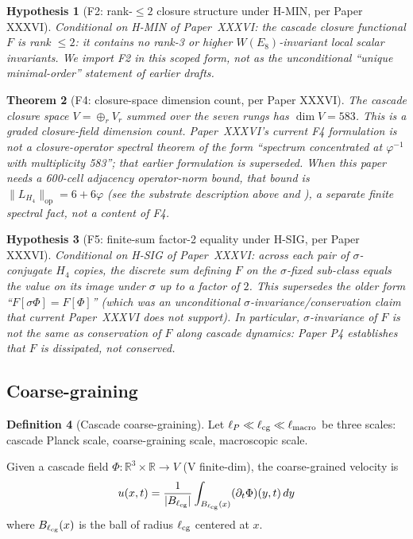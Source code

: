 \documentclass[11pt, a4paper]{amsart}
\newtheorem{theorem}{Theorem}[section]
\newtheorem{hypothesis}[theorem]{Hypothesis}
\theoremstyle{definition}
\newtheorem{definition}[theorem]{Definition}
\newcommand{\R}{\mathbb{R}}
\begin{document}
\begin{hypothesis}[F2: rank-$\le 2$ closure structure under H-MIN, per Paper XXXVI]\label{thm:F2}
\emph{Conditional on H-MIN of Paper~XXXVI}: the cascade closure
functional $F$ is rank $\leq 2$: it contains no rank-3 or higher
$W(E_8)$-invariant local scalar invariants. We import F2 in this
scoped form, not as the unconditional ``unique minimal-order''
statement of earlier drafts.
\end{hypothesis}

\begin{theorem}[F4: closure-space dimension count, per Paper XXXVI]\label{thm:F4}
The cascade closure space $V = \oplus_r V_r$ summed over the seven
rungs has $\dim V = 583$.  \emph{This is a graded
closure-field dimension count.}  Paper~XXXVI's current F4
formulation is \emph{not} a closure-operator spectral theorem of
the form ``spectrum concentrated at $\varphi^{-1}$ with multiplicity
583''; that earlier formulation is superseded.  When this paper
needs a 600-cell adjacency operator-norm bound, that bound is
$\|L_{H_4}\|_{\mathrm{op}} = 6+6\varphi$
(see the substrate description above and \cite{CascadeAttractorSpectrum}), a separate finite
spectral fact, not a content of F4.
\end{theorem}

\begin{hypothesis}[F5: finite-sum factor-2 equality under H-SIG, per Paper XXXVI]\label{thm:F5}
\emph{Conditional on H-SIG of Paper~XXXVI}: across each pair of
$\sigma$-conjugate $H_4$ copies, the discrete sum defining $F$ on
the $\sigma$-fixed sub-class equals the value on its image under
$\sigma$ up to a factor of $2$.  This \emph{supersedes} the older
form ``$F[\sigma\Phi] = F[\Phi]$'' (which was an unconditional
$\sigma$-invariance/conservation claim that current Paper~XXXVI
does not support).  In particular, $\sigma$-invariance of $F$ is
\emph{not} the same as conservation of $F$ along cascade dynamics:
Paper P4 establishes that $F$ is dissipated, not conserved.
\end{hypothesis}

\subsection{Coarse-graining}

\begin{definition}[Cascade coarse-graining]\label{def:coarse}
Let $\ell_P \ll \ell_{\rm cg} \ll \ell_{\rm macro}$ be three scales:
cascade Planck scale, coarse-graining scale, macroscopic scale.

Given a cascade field $\Phi: \R^3 \times \R \to V$ (V finite-dim),
the coarse-grained velocity is
\[
u(x, t) = \frac{1}{|B_{\ell_{\rm cg}}|} \int_{B_{\ell_{\rm cg}}(x)} (\partial_t \Phi)(y, t) \, dy
\]
where $B_{\ell_{\rm cg}}(x)$ is the ball of radius $\ell_{\rm cg}$
centered at $x$.
\end{definition}
\end{document}
